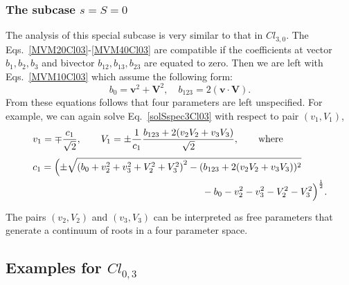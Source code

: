 \documentclass{birkjour}
\newcommand{\cl}[2]{\ensuremath{\mathit{Cl}_{#1,#2}}}
\newcommand{\bv}{\ensuremath{\mathbf{v}}}
\newcommand{\bV}{\ensuremath{\mathbf{V}}}
\begin{document}
\subsubsection{The subcase $s = S = 0$}
The analysis of this special subcase is very similar to that in
$\cl{3}{0}$. The Eqs.~\eqref{MVM20Cl03}-\eqref{MVM40Cl03} are
compatible if  the  coefficients at vector  $b_1, b_2, b_3$ and
bivector $b_{12}, b_{13}, b_{23}$  are equated to zero. Then we
are left with Eqs.~\eqref{MVM10Cl03} which assume the following
form:
\begin{equation}\label{solSspec3Cl03}
b_0=\bv^2+\bV^2,\quad b_{123}=2(\bv\cdot\bV).
\end{equation}
From these equations follows that  four parameters are left
unspecified. For example, we can again solve
Eq.~\eqref{solSspec3Cl03} with respect to pair $(v_1,V_1)$,
\begin{equation}\begin{split}
&v_{1}=\mp \frac{c_1}{\sqrt{2}},\qquad
  V_{1}=\pm \frac{1}{c_1} \frac{b_{123}+2 (v_{2} V_{2}+v_{3} V_{3})}{\sqrt{2}},\qquad \textrm{where}\quad \\[3pt]
&c_1=\Bigl(\pm\sqrt{\left(b_{0}+v_{2}^2+v_{3}^2+V_{2}^2+V_{3}^2\right)^2-
   (b_{123}+2 (v_{2} V_{2}+v_{3} V_{3}))^2}\\
&\phantom{\frac{1}{\sqrt{2}}b_{0}-v_{2}^2-v_{3}^2  (b_{123}-2
(v_{2} V_{2}+v_{3} V_{3}))x}
-b_{0}-v_{2}^2-v_{3}^2-V_{2}^2-V_{3}^2\Bigr)^{\frac{1}{2}}.
\end{split}
\end{equation}
The pairs  $(v_2,V_2)$ and $(v_3,V_3)$ can be interpreted as
free parameters that generate a continuum of roots in a four
parameter space.

\subsection{Examples for $\cl{0}{3}$}
\end{document}
